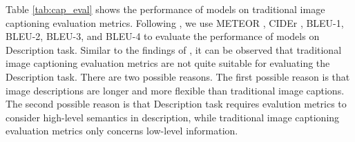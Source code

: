 Table \ref{tab:cap_eval} shows the performance of models on traditional image captioning evaluation metrics.
Following \citet{krause2017hierarchical}, we use METEOR \cite{banerjee-lavie-2005-meteor}, CIDEr \cite{vedantam2015cider}, BLEU-1, BLEU-2, BLEU-3, and BLEU-4 \cite{papineni2002bleu} to evaluate the performance of models on Description task.
Similar to the findings of \citet{zhu2023chatgpt}, it can be observed that traditional image captioning evaluation metrics are not quite suitable for evaluating the Description task. 
There are two possible reasons. 
The first possible reason is that image descriptions are longer and more flexible than traditional image captions.
The second possible reason is that Description task requires evalution metrics to consider high-level semantics in description, while traditional image captioning evaluation metrics only concerns low-level information.






